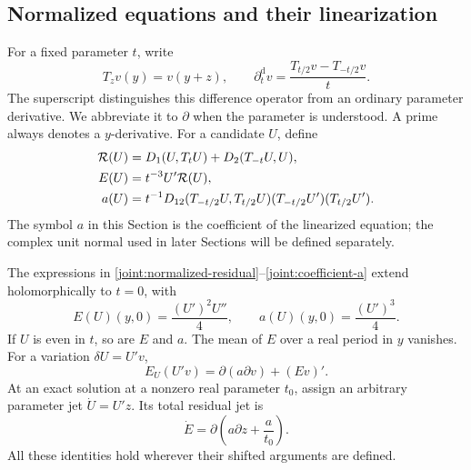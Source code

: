 \subsection{Normalized equations and their linearization}

For a fixed parameter \(t\), write
\[
 T_zv(y)=v(y+z),\qquad
 \partial_t^{\mathrm{d}}v=\frac{T_{t/2}v-T_{-t/2}v}{t}.
\]
The superscript distinguishes this difference operator from an ordinary
parameter derivative. We abbreviate it to \(\partial\) when the parameter
is understood. A prime always denotes a \(y\)-derivative. For a candidate
\(U\), define
\begin{align}
 \mathcal R(U)&=D_1(U,T_tU)+D_2(T_{-t}U,U),\notag\\
 E(U)&=t^{-3}U'\mathcal R(U),\label{joint:normalized-residual}\\
 a(U)&=t^{-1}D_{12}(T_{-t/2}U,T_{t/2}U)
                    (T_{-t/2}U')(T_{t/2}U').
 \label{joint:coefficient-a}
\end{align}
The symbol \(a\) in this Section is the coefficient of the linearized
equation; the complex unit normal used in later Sections will be defined
separately.

\begin{lemma}
\label{joint:factorization}
The expressions in \eqref{joint:normalized-residual}--\eqref{joint:coefficient-a}
extend holomorphically to \(t=0\), with
\begin{equation}
 E(U)(y,0)=\frac{(U')^2U''}{4},\qquad
 a(U)(y,0)=\frac{(U')^3}{4}.
 \label{joint:zero-parameter}
\end{equation}
If \(U\) is even in \(t\), so are \(E\) and \(a\). The mean of \(E\)
over a real period in \(y\) vanishes. For a variation \(\delta U=U'v\),
\begin{equation}
 E_U(U'v)=\partial(a\partial v)+(Ev)'.
 \label{joint:linearization}
\end{equation}
At an exact solution at a nonzero real parameter \(t_0\), assign an
arbitrary parameter jet \(\dot U=U'z\). Its total residual jet is
\begin{equation}
 \dot E=\partial\left(a\partial z+\frac{a}{t_0}\right).
 \label{joint:parameter-jet}
\end{equation}
All these identities hold wherever their shifted arguments are defined.
\end{lemma}


